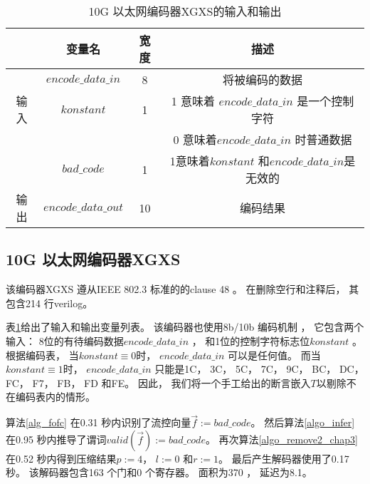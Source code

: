 \begin{table}[t]%
\caption{10G 以太网编码器XGXS的输入和输出}
\label{tab:eth10g}
\centering
\begin{tabular}{|c|c|c|c|}
\hline
         & 变量名               & 宽度  & 描述\\\hline\hline
         & $encode\_data\_in$   & 8     &将被编码的数据 \\\cline{2-4}
输入     & $konstant$           & 1     &1 意味着 $encode\_data\_in$ 是一个控制字符\\
         &                      &       &0 意味着$encode\_data\_in$ 时普通数据\\\cline{2-4}
         & $bad\_code$          & 1     &1意味着$konstant$ 和$encode\_data\_in$是无效的\\\hline
输出     & $encode\_data\_out$  & 10    &编码结果\\\hline
\end{tabular}
\end{table}%

\subsection{10G 以太网编码器XGXS}\label{subsec_10g}
该编码器XGXS 遵从IEEE 802.3 标准的的clause 48 。
在删除空行和注释后，
其包含214 行verilog。

表\ref{tab:eth10g}给出了输入和输出变量列表。
该编码器也使用8b/10b 编码机制 ，
它包含两个输入：
8位的有待编码数据$encode\_data\_in$ ，
和1位的控制字符标志位$konstant$ 。
根据编码表，
当$konstant\equiv 0$时，
$encode\_data\_in$ 可以是任何值。
而当$konstant\equiv 1$时，
$encode\_data\_in$ 只能是1C， 3C， 5C， 7C， 9C， BC， DC， FC， F7， FB， FD 和FE。
因此，
我们将一个手工给出的断言嵌入$T$以剔除不在编码表内的情形。

算法\ref{alg_fofc} 在0.31 秒内识别了流控向量$\vec{f}:=bad\_code$。
然后算法\ref{algo_infer}
在0.95 秒内推导了谓词$valid(\vec{f}):=\!bad\_code$。
再次算法\ref{algo_remove2_chap3} 在0.52 秒内得到压缩结果$p:=4$， $l:=0$ 和$r:=1$。
最后产生解码器使用了0.17 秒。
该解码器包含163 个门和0 个寄存器。
面积为370 ，
延迟为8.1。

